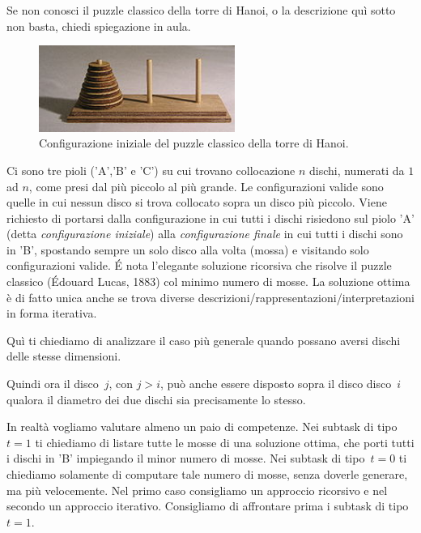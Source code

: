 \renewcommand{\nomebreve}{hanoi\_equal\_disks}
\renewcommand{\titolo}{The Hanoi puzzle with equal disks}

\introduzione{}

Se non conosci il puzzle classico della torre di Hanoi, o la descrizione quì sotto non basta, chiedi spiegazione in aula.

\begin{figure}[h!]
\begin{center}
  \noindent \includegraphics[width=0.57\textwidth]{figures/220px-Tower_of_Hanoi.jpeg}
\end{center}
\caption{Configurazione iniziale del puzzle classico della torre di Hanoi.}
\end{figure}

Ci sono tre pioli ('A','B' e 'C') su cui trovano collocazione $n$ dischi, numerati da $1$ ad $n$, come presi dal più piccolo al più grande. Le configurazioni valide sono quelle in cui nessun disco si trova collocato sopra un disco più piccolo.
Viene richiesto di portarsi dalla configurazione in cui tutti i dischi risiedono sul piolo 'A' (detta \emph{configurazione iniziale}) alla \emph{configurazione finale} in cui tutti i dischi sono in 'B', spostando sempre un solo disco alla volta (mossa) e visitando solo configurazioni valide.
\'E nota l'elegante soluzione ricorsiva che risolve il puzzle classico (Édouard Lucas, 1883) col minimo numero di mosse. La soluzione ottima è di fatto unica anche se trova diverse descrizioni/rappresentazioni/interpretazioni in forma iterativa.

\begin{center}
\end{center}

Quì ti chiediamo di analizzare il caso più generale quando possano aversi dischi delle stesse dimensioni.

Quindi ora il disco~$j$, con $j>i$, può anche essere disposto sopra il disco disco~$i$ qualora il diametro dei due dischi sia precisamente lo stesso.

In realtà vogliamo valutare almeno un paio di competenze. Nei subtask di tipo~$t=1$ ti chiediamo di listare tutte le mosse di una soluzione ottima, che porti tutti i dischi in 'B' impiegando il minor numero di mosse.
Nei subtask di tipo~$t=0$ ti chiediamo solamente di computare tale numero di mosse, senza doverle generare, ma più velocemente.
Nel primo caso consigliamo un approccio ricorsivo e nel secondo un approccio iterativo.
Consigliamo di affrontare prima i subtask di tipo~$t=1$.


